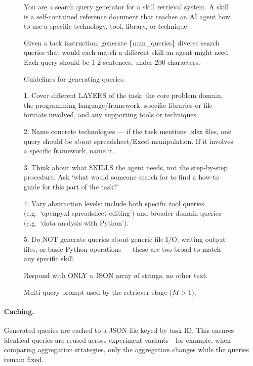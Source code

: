 \documentclass[11pt]{article}
\begin{document}
\begin{figure}[t]
\begin{tcolorbox}[title=Multi-Query Prompt, colback=gray!5, colframe=gray!50, fonttitle=\bfseries\small, fontupper=\small\ttfamily\raggedright]
You are a search query generator for a skill retrieval system. A skill is a self-contained reference document that teaches an AI agent how to use a specific technology, tool, library, or technique.

Given a task instruction, generate \{num\_queries\} diverse search queries that would each match a different skill an agent might need. Each query should be 1-2 sentences, under 200 characters.

Guidelines for generating queries:

1. Cover different LAYERS of the task: the core problem domain, the programming language/framework, specific libraries or file formats involved, and any supporting tools or techniques.

2. Name concrete technologies --- if the task mentions .xlsx files, one query should be about spreadsheet/Excel manipulation. If it involves a specific framework, name it.

3. Think about what SKILLS the agent needs, not the step-by-step procedure. Ask `what would someone search for to find a how-to guide for this part of the task?'

4. Vary abstraction levels: include both specific tool queries (e.g.\ `openpyxl spreadsheet editing') and broader domain queries (e.g.\ `data analysis with Python').

5. Do NOT generate queries about generic file I/O, writing output files, or basic Python operations --- these are too broad to match any specific skill.

Respond with ONLY a JSON array of strings, no other text.
\end{tcolorbox}
\caption{Multi-query prompt used by the retriever stage ($M > 1$).}
\label{box:multi_query_prompt}
\end{figure}

\paragraph{Caching.}
Generated queries are cached to a JSON file keyed by task ID.
This ensures identical queries are reused across experiment variants---for example, when comparing aggregation strategies, only the aggregation changes while the queries remain fixed.
\end{document}
